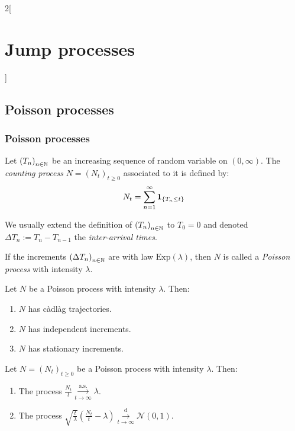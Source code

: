 \documentclass[../../../main_math.tex]{subfiles}
\begin{document}
\begin{multicols}{2}[\section{Jump processes}]
  \subsection{Poisson processes}
  \subsubsection{Poisson processes}
  \begin{definition}
    Let ${(T_n)}_{n\in\mathbb{N}}$ be an increasing sequence of random variable on $(0,\infty)$. The \emph{counting process} $N={(N_t)}_{t\geq 0}$ associated to it is defined by:
    $$
      N_t=\sum_{n=1}^{\infty}\boldsymbol{\mathrm{1}}_{\{T_n\leq t\}}
    $$
  \end{definition}
  \begin{remark}
    We usually extend the definition of ${(T_n)}_{n\in\mathbb{N}}$ to $T_0=0$ and denoted $\Delta T_n:=T_n-T_{n-1}$ the \emph{inter-arrival times}.
  \end{remark}
  \begin{definition}
    If the increments ${(\Delta T_n)}_{n\in\mathbb{N}}$ are \iid with law $\text{Exp}(\lambda)$, then $N$ is called a \emph{Poisson process} with intensity $\lambda$.
  \end{definition}
  \begin{proposition}
    Let $N$ be a Poisson process with intensity $\lambda$. Then:
    \begin{enumerate}
      \item $N$ has càdlàg trajectories.
      \item $N$ has independent increments.
      \item $N$ has stationary increments.
    \end{enumerate}
  \end{proposition}
  \begin{theorem}
    Let $N={(N_t)}_{t\geq 0}$ be a Poisson process with intensity $\lambda$. Then:
    \begin{enumerate}
      \item The process $\displaystyle\frac{N_t}{t}\overset{\text{a.s.}}{\underset{t\to\infty}{\longrightarrow}}\lambda$.
      \item The process $\displaystyle \sqrt{\frac{t}{\lambda}}\left(\frac{N_t}{t}-\lambda\right)\overset{\text{d}}{\underset{t\to\infty}{\longrightarrow}}\mathcal{N}(0,1)$.
    \end{enumerate}
  \end{theorem}

\end{multicols}
\end{document}

